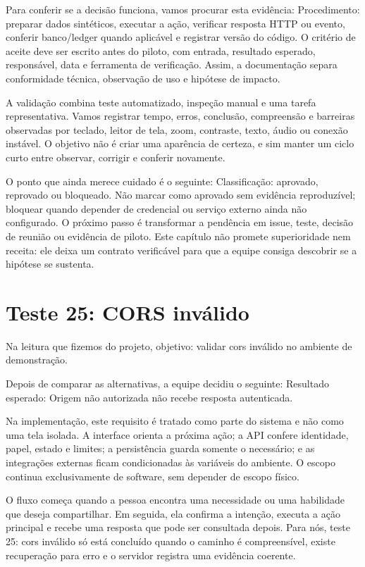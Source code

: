 \documentclass[12pt,oneside,a4paper,article]{abntex2}
\begin{document}
Para conferir se a decisão funciona, vamos procurar esta evidência: Procedimento: preparar dados sintéticos, executar a ação, verificar resposta HTTP ou evento, conferir banco/ledger quando aplicável e registrar versão do código. O critério de aceite deve ser escrito antes do piloto, com entrada, resultado esperado, responsável, data e ferramenta de verificação. Assim, a documentação separa conformidade técnica, observação de uso e hipótese de impacto.

A validação combina teste automatizado, inspeção manual e uma tarefa representativa. Vamos registrar tempo, erros, conclusão, compreensão e barreiras observadas por teclado, leitor de tela, zoom, contraste, texto, áudio ou conexão instável. O objetivo não é criar uma aparência de certeza, e sim manter um ciclo curto entre observar, corrigir e conferir novamente.

O ponto que ainda merece cuidado é o seguinte: Classificação: aprovado, reprovado ou bloqueado. Não marcar como aprovado sem evidência reproduzível; bloquear quando depender de credencial ou serviço externo ainda não configurado. O próximo passo é transformar a pendência em issue, teste, decisão de reunião ou evidência de piloto. Este capítulo não promete superioridade nem receita: ele deixa um contrato verificável para que a equipe consiga descobrir se a hipótese se sustenta.

\section{Teste 25: CORS inválido}
Na leitura que fizemos do projeto, objetivo: validar cors inválido no ambiente de demonstração.

Depois de comparar as alternativas, a equipe decidiu o seguinte: Resultado esperado: Origem não autorizada não recebe resposta autenticada.

Na implementação, este requisito é tratado como parte do sistema e não como uma tela isolada. A interface orienta a próxima ação; a API confere identidade, papel, estado e limites; a persistência guarda somente o necessário; e as integrações externas ficam condicionadas às variáveis do ambiente. O escopo continua exclusivamente de software, sem depender de escopo físico.

O fluxo começa quando a pessoa encontra uma necessidade ou uma habilidade que deseja compartilhar. Em seguida, ela confirma a intenção, executa a ação principal e recebe uma resposta que pode ser consultada depois. Para nós, teste 25: cors inválido só está concluído quando o caminho é compreensível, existe recuperação para erro e o servidor registra uma evidência coerente.
\end{document}
